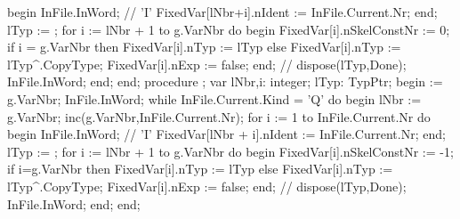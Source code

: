       begin
         InFile.InWord; // 'I'
         FixedVar[lNbr+i].nIdent := InFile.Current.Nr;
      end;
      lTyp := ;
      for i := lNbr + 1 to g.VarNbr do
      begin
         FixedVar[i].nSkelConstNr := 0;
         if i = g.VarNbr then
            FixedVar[i].nTyp := lTyp
         else
            FixedVar[i].nTyp := lTyp^.CopyType;
         FixedVar[i].nExp := false;
      end;
      // dispose(lTyp,Done);
      InFile.InWord;
   end;
end;
\eatline
{}\nwendcode{}\nwdocspar
\nwenddocs{}\endmoddef\nwstartdeflinemarkup{}\nwenddeflinemarkup
procedure ;
var
   lNbr,i: integer;
   lTyp: TypPtr;
begin
    := g.VarNbr;
   InFile.InWord;
   while InFile.Current.Kind = 'Q' do
   begin
      lNbr := g.VarNbr;
      inc(g.VarNbr,InFile.Current.Nr);
      for i := 1 to InFile.Current.Nr do
      begin InFile.InWord; // 'I'
      FixedVar[lNbr + i].nIdent := InFile.Current.Nr;
      end;
      lTyp := ;
      for i := lNbr + 1 to g.VarNbr do
      begin
         FixedVar[i].nSkelConstNr := -1;
         if i=g.VarNbr then
            FixedVar[i].nTyp := lTyp
         else FixedVar[i].nTyp := lTyp^.CopyType;
         FixedVar[i].nExp := false;
      end;
      //   dispose(lTyp,Done);
      InFile.InWord;
   end;
end;
\eatline
